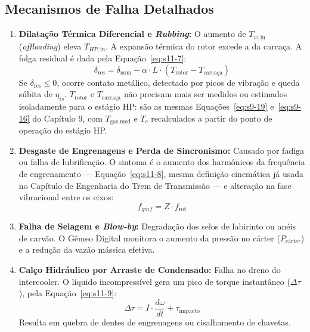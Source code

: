 \documentclass[12pt,a4paper]{article}
\numberwithin{equation}{section}
\numberwithin{table}{section}
\numberwithin{figure}{section}
\begin{document}
{	\subsection{\textbf{Mecanismos de Falha Detalhados}}
	
	\begin{enumerate}
		\item \textbf{Dilatação Térmica Diferencial e \textit{Rubbing}:}
		O aumento de $T_{w,\text{in}}$ (\textit{offloading}) eleva $T_{HP,\text{in}}$. A expansão térmica do rotor excede a da carcaça. A folga residual é dada pela Equação~\eqref{eq:s11-7}:
		\begin{equation}\label{eq:s11-7}
 \delta_{\text{res}} = \delta_{\text{nom}} - \alpha \cdot L \cdot (T_{\text{rotor}} - T_{\text{carcaça}}) 
\end{equation}
		Se $\delta_{\text{res}} \le 0$, ocorre contato metálico, detectado por picos de vibração e queda súbita de $\eta_{is}$. $T_{\text{rotor}}$ e $T_{\text{carcaça}}$ não precisam mais ser medidos ou estimados isoladamente para o estágio HP: são as mesmas Equações~\eqref{eq:s9-19} e~\eqref{eq:s9-16} do Capítulo 9, com $T_{\text{gas,med}}$ e $T_c$ recalculados a partir do ponto de operação do estágio HP.

		\item \textbf{Desgaste de Engrenagens e Perda de Sincronismo:}
		Causado por fadiga ou falha de lubrificação. O sintoma é o aumento dos harmônicos da frequência de engrenamento — Equação~\eqref{eq:s11-8}, mesma definição cinemática já usada no Capítulo de Engenharia do Trem de Transmissão — e alteração na fase vibracional entre os eixos:
		\begin{equation}\label{eq:s11-8}
 f_{gmf} = Z \cdot f_{\text{rot}}
\end{equation}
		
		\item \textbf{Falha de Selagem e \textit{Blow-by}:}
		Degradação dos selos de labirinto ou anéis de carvão. O Gêmeo Digital monitora o aumento da pressão no cárter ($P_{\text{cárter}}$) e a redução da vazão mássica efetiva.
		
		\item \textbf{Calço Hidráulico por Arraste de Condensado:}
		Falha no dreno do intercooler. O líquido incompressível gera um pico de torque instantâneo ($\Delta \tau$), pela Equação~\eqref{eq:s11-9}:
		\begin{equation}\label{eq:s11-9}
 \Delta \tau = I \cdot \frac{d\omega}{dt} + \tau_{\text{impacto}}
\end{equation}
		Resulta em quebra de dentes de engrenagens ou cisalhamento de chavetas.
		

\end{enumerate}}
\end{document}
